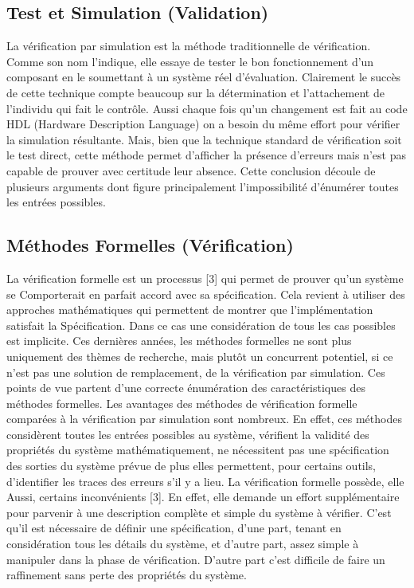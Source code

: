 \documentclass[french]{spimufcphdthesis}
\begin{document}
\subsection{Test et Simulation (Validation)}
La  vérification  par  simulation est  la  méthode traditionnelle  de  vérification.  Comme  son  nom l’indique,   elle    essaye   de tester   le   bon fonctionnement    d’un    composant    en    le soumettant   à  un   système   réel   d’évaluation. Clairement  le  succès    de  cette  technique  compte beaucoup    sur  la  détermination  et  l’attachement de  l’individu  qui  fait  le  contrôle.  Aussi  chaque fois  qu'un  changement  est  fait  au  code  HDL (Hardware Description Language) on a besoin du même   effort   pour   vérifier   la   simulation résultante.  Mais,  bien  que  la  technique  standard de  vérification  soit  le  test  direct,    cette  méthode permet d’afficher la présence d’erreurs mais n’est pas  capable  de  prouver  avec  certitude  leur absence.  Cette  conclusion  découle  de  plusieurs arguments dont figure principalement l’impossibilité   d’énumérer   toutes   les   entrées possibles.  

\subsection{Méthodes Formelles (Vérification)}
La vérification formelle    est un processus [3] qui   permet   de   prouver   qu’un   système   se 
Comporterait    en    parfait    accord    avec    sa spécification.   Cela   revient   à   utiliser   des approches mathématiques qui permettent de montrer   que   l’implémentation   satisfait   la  
Spécification. Dans ce cas une considération de tous les cas possibles est implicite. Ces dernières années, les méthodes formelles ne sont plus uniquement des thèmes de recherche, mais plutôt un concurrent potentiel, si ce n’est pas une solution de remplacement, de la vérification par simulation. Ces points de vue partent d’une correcte énumération des caractéristiques des méthodes formelles. Les avantages des méthodes de vérification formelle comparées à la vérification par simulation sont nombreux. En effet, ces méthodes considèrent toutes les entrées possibles au système, vérifient la validité des propriétés du système mathématiquement, ne nécessitent pas une spécification des sorties du système prévue de plus elles permettent, pour certains outils, d’identifier les traces des erreurs s’il y a lieu. La vérification formelle possède, elle 
Aussi, certains inconvénients [3]. En effet, elle demande un effort supplémentaire pour parvenir à une description complète et simple du système à vérifier. C’est qu’il est nécessaire de définir une spécification, d’une part, tenant en considération tous les détails du système, et d’autre part, assez simple à manipuler dans la phase de vérification. D’autre part c’est difficile de faire un raffinement sans perte des propriétés du système. 
\end{document}
